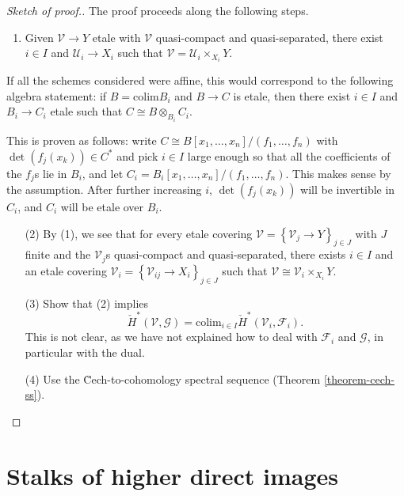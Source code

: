 \begin{proof}[Sketch of proof.]
The proof proceeds along the following steps.
\begin{enumerate}
\item Given $\mathcal{V}\to Y$ etale with $\mathcal{V}$ quasi-compact and
quasi-separated, there exist $i\in I$ and $\mathcal{U}_i \to X_i$ such that
$\mathcal{V} = \mathcal{U}_i \times_{X_i} Y$.
\end{enumerate}
If all the schemes considered were affine, this would correspond to the
following algebra statement: if $B=\text{colim} B_i$ and $B\to C$ is etale,
then there exist $i\in I$ and $B_i\to C_i$ etale such that $C \cong B
\otimes_{B_i} C_i$.

\medskip\noindent
This is proven as follows: write $C \cong B\left[x_1,\ldots, x_n\right]/(f_1,
\ldots, f_n)$ with $\det (f_j(x_k)) \in C^*$ and pick $i\in I$ large enough so
that all the coefficients of the $f_j$s lie in $B_i$, and let $C_i =
B_i\left[x_1, \ldots, x_n\right]/(f_1, \dots, f_n)$. This makes sense by the
assumption. After further increasing $i$, $\det (f_j(x_k))$ will be invertible
in $C_i$, and $C_i$ will be etale over $B_i$.
\begin{enumerate}
\item[(2)]
By (1), we see that for every etale covering $\mathcal{V} =
\left\{\mathcal{V}_j\to Y\right\}_{j\in J}$ with $J$ finite and the
$\mathcal{V}_j$s quasi-compact and quasi-separated, there exists $i\in I$ and
an etale covering $\mathcal{V}_i = \left\{\mathcal{V}_{ij} \to X_i
\right\}_{j\in J}$ such that $\mathcal{V} \cong \mathcal{V}_i\times_{X_i} Y$.
\item[(3)]
Show that (2) implies
$$
\check H^*(\mathcal{V}, \mathcal{G})=\text{colim}_{i\in I}\check
H^*(\mathcal{V}_i, \mathcal{F}_i).
$$
This is not clear, as we have not explained how to deal with $\mathcal{F}_i$
and $\mathcal{G}$, in particular with the dual.
\item[(4)] Use the \u Cech-to-cohomology spectral sequence
(Theorem \ref{theorem-cech-ss}).
\end{enumerate}
\end{proof}





\section{Stalks of higher direct images}
\label{section-stalks-direct-image}

